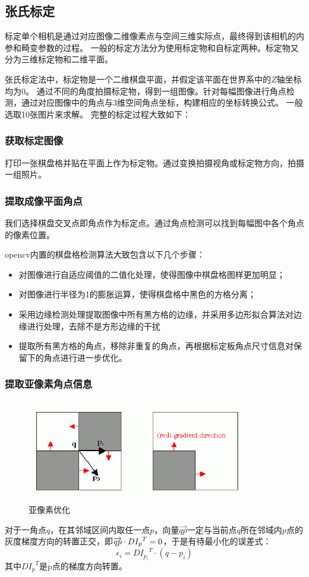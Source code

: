 \documentclass[UTF8]{ctexart}
\begin{document}
\begin{CJK*}{UTF8}{gbsn}
\subsection{张氏标定}
标定单个相机是通过对应图像二维像素点与空间三维实际点，最终得到该相机的内参和畸变参数的过程。
一般的标定方法分为使用标定物和自标定两种。标定物又分为三维标定物和二维平面。

张氏标定法中，标定物是一个二维棋盘平面，并假定该平面在世界系中的$Z$轴坐标均为0。
通过不同的角度拍摄标定物，得到一组图像。针对每幅图像进行角点检测，通过对应图像中的角点与3维空间角点坐标，构建相应的坐标转换公式。
一般选取10张图片来求解。
完整的标定过程大致如下：
\subsubsection{获取标定图像}
打印一张棋盘格并贴在平面上作为标定物。通过变换拍摄视角或标定物方向，拍摄一组照片。
\subsubsection{提取成像平面角点}
我们选择棋盘交叉点即角点作为标定点。通过角点检测可以找到每幅图中各个角点的像素位置。

opencv内置的棋盘格检测算法大致包含以下几个步骤：
\begin{itemize}
    \item 对图像进行自适应阈值的二值化处理，使得图像中棋盘格图样更加明显；
    \item 对图像进行半径为1的膨胀运算，使得棋盘格中黑色的方格分离；
    \item 采用边缘检测处理提取图像中所有黑方格的边缘，并采用多边形拟合算法对边缘进行处理，去除不是方形边缘的干扰
    \item 提取所有黑方格的角点，移除非重复的角点，再根据标定板角点尺寸信息对保留下的角点进行进一步优化。
\end{itemize}
\subsubsection{提取亚像素角点信息}
\begin{figure}[htbp]
    \centering
    \includegraphics[height=4.5cm,width=9.5cm]{cornersubpix.png}
    \caption{亚像素优化}
\end{figure}
对于一角点$q$，在其邻域区间内取任一点$p$，向量$\overrightarrow {qp} $一定与当前点$q$所在邻域内$p$点的灰度梯度方向的转置正交，即$\overrightarrow {qp} {\rm{ }} \cdot {\rm{ }}D{I_p}^T = 0$，于是有待最小化的误差式：
\begin{equation}
    \epsilon _i = {DI_{p_i}}^T \cdot (q - p_i)
\end{equation}
其中${DI_p}^T$是p点的梯度方向转置。

\end{CJK*}
\end{document}
